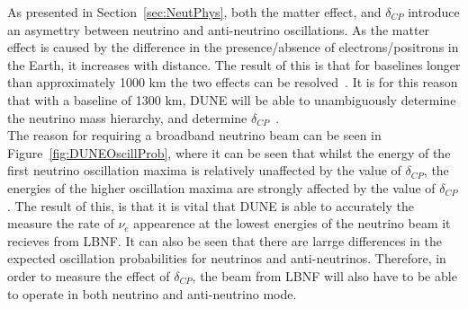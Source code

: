 As presented in Section~\ref{sec:NeutPhys}, both the matter effect, and $\delta_{CP}$ introduce an asymettry between neutrino and anti-neutrino oscillations. As the matter effect is caused by the difference in the presence/absence of electrons/positrons in the Earth, it increases with distance. The result of this is that for baselines longer than approximately 1000 km the two effects can be resolved~\citep{Bass:2013vcg}. It is for this reason that with a baseline of 1300 km, DUNE will be able to unambiguously determine the neutrino mass hierarchy, and determine $\delta_{CP}$~\citep{Diwan:2004bt}. \\

The reason for requiring a broadband neutrino beam can be seen in Figure~\ref{fig:DUNEOscillProb}, where it can be seen that whilst the energy of the first neutrino oscillation maxima is relatively unaffected by the value of $\delta_{CP}$, the energies of the higher oscillation maxima are strongly affected by the value of $\delta_{CP}$. The result of this, is that it is vital that DUNE is able to accurately the measure the rate of $\nu_e$ appearence at the lowest energies of the neutrino beam it recieves from LBNF. It can also be seen that there are larrge differences in the expected oscillation probabilities for neutrinos and anti-neutrinos. Therefore, in order to measure the effect of $\delta_{CP}$, the beam from LBNF will also have to be able to operate in both neutrino and anti-neutrino mode. \\

